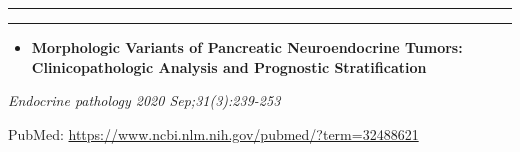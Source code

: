 \documentclass[
]{article}
\providecommand{\tightlist}{%
  \setlength{\itemsep}{0pt}\setlength{\parskip}{0pt}}
\begin{document}
\begin{center}\rule{0.5\linewidth}{0.5pt}\end{center}

\begin{center}\rule{0.5\linewidth}{0.5pt}\end{center}

\begin{itemize}
\tightlist
\item
  \textbf{Morphologic Variants of Pancreatic Neuroendocrine Tumors:
  Clinicopathologic Analysis and Prognostic Stratification}
\end{itemize}

\emph{Endocrine pathology 2020 Sep;31(3):239-253}

PubMed: \url{https://www.ncbi.nlm.nih.gov/pubmed/?term=32488621}
\end{document}
